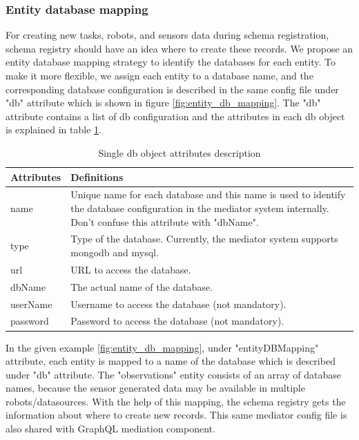 	\subsubsection{Entity database mapping} \label{subsubsection:entity_database_mapping}
	For creating new tasks, robots, and sensors data during schema registration, schema registry should have an idea where to create these records. We propose an entity database mapping strategy to identify the databases for each entity. To make it more flexible, we assign each entity to a database name, and the corresponding database configuration is described in the same config file under "db" attribute which is shown in figure \ref{fig:entity_db_mapping}. The "db" attribute contains a list of db configuration and the attributes in each db object is explained in table \ref{tab:db_attribute_desc}. 
	
	\begin{table}[h!]
		\begin{tabular}{|l|p{12cm}|}
			\hline
			\textbf{Attributes} & \textbf{Definitions} \\ \hline
			
			name & Unique name for each database and this name is used to identify the database configuration in the mediator system internally. Don't confuse this attribute with "dbName". \\ \hline
			type & Type of the database. Currently, the mediator system supports mongodb and mysql. \\ \hline
			url & URL to access the database. \\ \hline
			dbName & The actual name of the database. \\ \hline
			userName & Username to access the database (not mandatory). \\ \hline
			password & Password to access the database (not mandatory). \\ \hline
			
		\end{tabular}
		\caption{Single db object attributes description}
		\label{tab:db_attribute_desc}
	\end{table}
	
	
	In the given example \ref{fig:entity_db_mapping}, under "entityDBMapping" attribute, each entity is mapped to a name of the database which is described under "db" attribute. The "observations" entity consists of an array of database names, because the sensor generated data may be available in multiple robots/datasources. With the help of this mapping, the schema registry gets the information about where to create new records. This same mediator config file is also shared with GraphQL mediation component.
	
